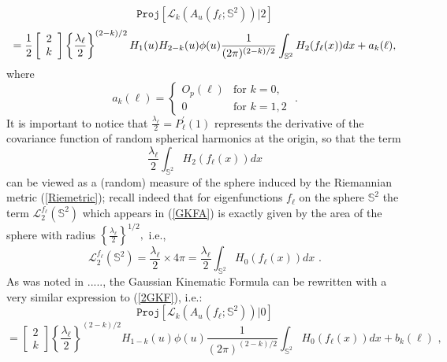 \documentclass[aps,prd,showpacs,superscriptaddress,groupedaddress]{revtex4-1}  %
\begin{document}
\begin{equation*}
\mathtt{Proj}[\mathcal{L}_{k}(A_{u}(f_{\ell };\mathbb{S}^{2}))|2]
\end{equation*}%
\begin{equation}
=\frac{1}{2}\left[ 
\begin{array}{c}
2 \\ 
k%
\end{array}%
\right] \left\{ \frac{\lambda _{\ell }}{2}\right\}
^{(2-k)/2}H_{1}(u)H_{2-k}(u)\phi (u)\frac{1}{(2\pi )^{(2-k)/2}}\int_{\mathbb{%
S}^{2}}H_{2}(f_{\ell }(x))dx+a_{k}(\ell ),  \label{2GKF}
\end{equation}%
where
\begin{equation*}
a_{k}(\ell )=\left\{ 
\begin{array}{cc}
O_{p}(\ell ) & \text{for }k=0, \\ 
0 & \text{for }k=1,2%
\end{array}%
\right. \text{ .}
\end{equation*}%
It is important to notice that $\frac{\lambda _{\ell }}{2}=P_{\ell }^{\prime
}(1)$ represents the derivative of the covariance function of random
spherical harmonics at the origin, so that the term%
\begin{equation*}
\frac{\lambda _{\ell }}{2}\int_{\mathbb{S}^{2}}H_{2}(f_{\ell }(x))dx
\end{equation*}%
can be viewed as a (random) measure of the sphere induced by the Riemannian
metric (\ref{Riemetric}); recall indeed that for eigenfunctions $f_{\ell }$
on the sphere $\mathbb{S}^{2}$ the term ${\mathcal{L}}_{2}^{f_{\ell }}(%
\mathbb{S}^{2})$ which appears in (\ref{GKFA}) is exactly given by the area
of the sphere with radius $\left\{ \frac{\lambda _{\ell }}{2}\right\}
^{1/2}, $ i.e., 
\begin{equation*}
{\mathcal{L}}_{2}^{f_{\ell }}(\mathbb{S}^{2})=\frac{\lambda _{\ell }}{2}%
\times 4\pi =\frac{\lambda _{\ell }}{2}\int_{\mathbb{S}^{2}}H_{0}(f_{\ell
}(x))dx\text{ .}
\end{equation*}%
As was noted in ....., the Gaussian Kinematic Formula can be rewritten with a very similar expression to (\ref{2GKF}), i.e.: 
\begin{equation*}
\mathtt{Proj}[\mathcal{L}_{k}(A_{u}(f_{\ell };\mathbb{S}^{2}))|0]
\end{equation*}%
\begin{equation}
=\left[ 
\begin{array}{c}
2 \\ 
k%
\end{array}%
\right] \left\{ \frac{\lambda _{\ell }}{2}\right\} ^{(2-k)/2}H_{1-k}(u)\phi
(u)\frac{1}{(2\pi )^{(2-k)/2}}\int_{\mathbb{S}^{2}}H_{0}(f_{\ell
}(x))dx+b_{k}(\ell )\text{ ,}  \label{1GKF}
\end{equation}%
\end{document}
